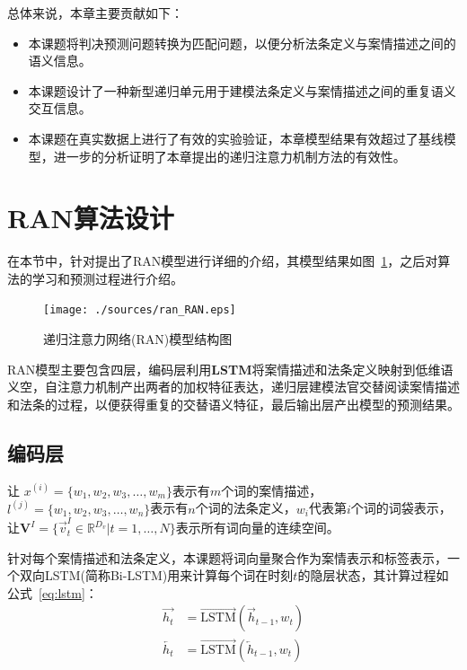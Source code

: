 总体来说，本章主要贡献如下：
\begin{itemize}
    \item 本课题将判决预测问题转换为匹配问题，以便分析法条定义与案情描述之间的语义信息。
    \item 本课题设计了一种新型递归单元用于建模法条定义与案情描述之间的重复语义交互信息。
    \item 本课题在真实数据上进行了有效的实验验证，本章模型结果有效超过了基线模型，进一步的分析证明了本章提出的递归注意力机制方法的有效性。
\end{itemize}

\section{RAN算法设计}
\label{sec:ran_algori}

在本节中，针对提出了RAN模型进行详细的介绍，其模型结果如图~\ref{fig:ran_model}，之后对算法的学习和预测过程进行介绍。
\begin{figure}[htbp]
    \centering
    \texttt{[image: ./sources/ran\_RAN.eps]}
    \vspace{-10pt}
    \caption{\label{fig:ran_model} 递归注意力网络(RAN)模型结构图 }
    \vspace{-5pt}
\end{figure}

RAN模型主要包含四层，编码层利用\textbf{LSTM}将案情描述和法条定义映射到低维语义空，自注意力机制产出两者的加权特征表达，递归层建模法官交替阅读案情描述和法条的过程，以便获得重复的交替语义特征，最后输出层产出模型的预测结果。

\subsection{编码层}
让 $x^{(i)} = {\{w_1, w_2, w_3, \dots, w_m\}}$表示有$m$个词的案情描述， $l^{(j)} = {\{w_1, w_2, w_3, \dots, w_n\}}$表示有$n$个词的法条定义，$w_i$代表第$i$个词的词袋表示，让$\textbf{V}^I=\{\vec{v}^I_t\in \mathbb{R}^{D_v}|t=1,\dots,N\}$表示所有词向量的连续空间。

针对每个案情描述和法条定义，本课题将词向量聚合作为案情表示和标签表示，一个双向LSTM(简称Bi-LSTM)用来计算每个词在时刻$t$的隐层状态，其计算过程如公式~\ref{eq:lstm}：
\begin{equation}\label{eq:lstm}
    \begin{aligned}
        \overrightarrow{h_t}&=\overrightarrow{\text{LSTM}}(\overrightarrow{h}_{t-1}, w_t)\\
        \overleftarrow{h_t}&=\overrightarrow{\text{LSTM}}(\overleftarrow{h}_{t-1}, w_t)\\
    \end{aligned}
\end{equation}

